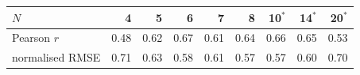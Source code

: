 \begin{tabular}{lrrrrrrrr}
\toprule
$N$ & 4 & 5 & 6 & 7 & 8 & 10$^\ast$ & 14$^\ast$ & 20$^\ast$ \\
\midrule
Pearson $r$ & 0.48 & 0.62 & 0.67 & 0.61 & 0.64 & 0.66 & 0.65 & 0.53 \\
normalised RMSE & 0.71 & 0.63 & 0.58 & 0.61 & 0.57 & 0.57 & 0.60 & 0.70 \\
\bottomrule
\end{tabular}
